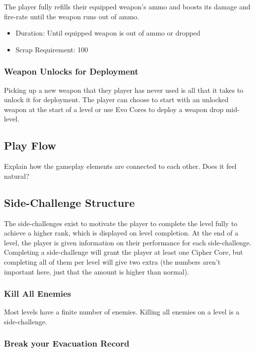 \documentclass[12pt]{article}
\begin{document}
The player fully refills their equipped weapon's ammo and boosts its damage and fire-rate until the weapon runs out of ammo.

\begin{itemize}
	\item Duration: Until equipped weapon is out of ammo or dropped 
	\item Scrap Requirement: 100
\end{itemize}

\subsubsection{Weapon Unlocks for Deployment}

Picking up a new weapon that they player has never used is all that it takes to unlock it for deployment. The player can choose to start with an unlocked weapon at the start of a level or use Evo Cores to deploy a weapon drop mid-level. 

\subsection{Play Flow}

Explain how the gameplay elements are connected to each other. Does it feel natural?

\subsection{Side-Challenge Structure}

The side-challenges exist to motivate the player to complete the level fully to achieve a higher rank, which is displayed on level completion. At the end of a level, the player is given information on their performance for each side-challenge. Completing a side-challenge will grant the player at least one Cipher Core, but completing all of them per level will give two extra (the numbers aren't important here, just that the amount is higher than normal). 

\subsubsection{Kill All Enemies}

Most levels have a finite number of enemies. Killing all enemies on a level is a side-challenge.

\subsubsection{Break your Evacuation Record}
\end{document}
